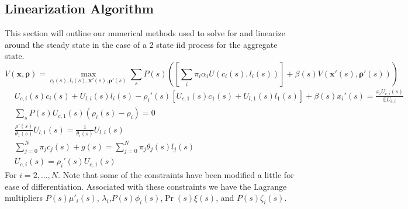 \documentclass[thmsb,11pt]{article}
\begin{document}
\begin{appendix}
\section{Linearization Algorithm}\label{apndx: numerical methods}
This section will outline our numerical methods used to solve for and linearize around the steady state in the case of a 2 state iid process for the aggregate state.
\begin{equation}
	V(\bm x,\bm \rho) = \max_{c_i(s),l_i(s),\bm x'(s),\bm\rho'(s)} \sum_s P(s)\left(\left[\sum_i\pi_i \alpha_i U(c_i(s),l_i(s))\right] + \beta(s) V(\bm x'(s),\bm \rho'(s))\right)\label{eq.obj}
\end{equation}
\begin{subequations}
\begin{align}
	&U_{c,i}(s)c_i(s)+U_{l,i}(s)l_i(s) - \rho_i'(s)\left[U_{c,1}(s)c_1(s)+U_{l,1}(s)l_1(s)\right]+ \beta(s)x_i'(s) = \frac{x_i U_{c,i}(s)}{\mathbb{E} U_{c,i}}\label{eq.imp_con}\\
	&\sum_s P(s) U_{c,1}(s)(\rho_i(s) -\rho_i) = 0\\
	&\frac{\rho'(s)}{\theta_1(s)}U_{l,1}(s) = \frac{1}{\theta_i(s)}U_{l,i}(s)\\
	& \sum_{j=0}^N\pi_j c_j(s)  + g(s) = \sum_{j=0}^{N} \pi_j\theta_j(s)l_j(s)\\
	& U_{c,i}(s) = \rho_i'(s) U_{c,1}(s)\label{eq.rho_con}
\end{align}\end{subequations}  For $i=2,\ldots,N$.  Note that some of the constraints have been modified a little for ease of differentiation.  Associated with these constraints we have the Lagrange multipliers $P(s)\mu'_i(s)$, $\lambda_i$,$P(s)\phi_i(s)$,$\Pr(s)\xi(s)$, and $P(s)\zeta_i(s)$.


\end{appendix}
\end{document}
